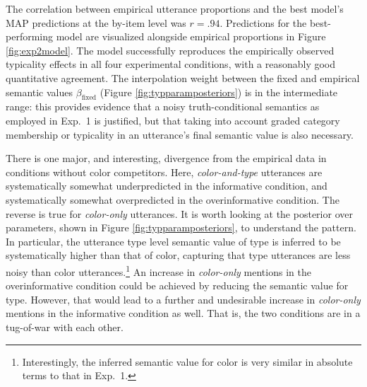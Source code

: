 \documentclass[11pt]{article}
\newcommand{\figref}[1]{Figure \ref{#1}}
\begin{document}
The correlation between empirical utterance proportions and the best model's MAP predictions at the by-item level was $r=.94$. Predictions for the best-performing model are visualized alongside empirical proportions in \figref{fig:exp2model}. The model successfully reproduces the empirically observed typicality effects in all four experimental conditions, with a reasonably good quantitative agreement. 
The interpolation weight between the fixed and empirical semantic values $\beta_{\textrm{fixed}}$ (\figref{fig:typparamposteriors}) is in the intermediate range: this provides evidence that a noisy truth-conditional semantics as employed in Exp.~1 is justified, but that taking into account graded category membership or typicality in an utterance's final semantic value is also necessary. 

There is one major, and interesting, divergence from the empirical data in conditions without color competitors. Here, \emph{color-and-type} utterances are systematically somewhat underpredicted in the informative condition, and systematically somewhat overpredicted in the overinformative condition. The reverse is true for \emph{color-only} utterances. It is worth looking at the posterior over parameters, shown in \figref{fig:typparamposteriors}, to understand the pattern. In particular, the utterance type level semantic value of type is inferred to be systematically higher than that of color, capturing that type utterances are less noisy than color utterances.\footnote{Interestingly, the inferred semantic value for color is very similar in absolute terms to that in Exp.~1.} An increase in \emph{color-only} mentions in the overinformative condition could be achieved by reducing the semantic value for type. However, that would lead to a further and undesirable increase in \emph{color-only} mentions in the informative condition as well. That is, the two conditions are in a tug-of-war with each other.
\end{document}
